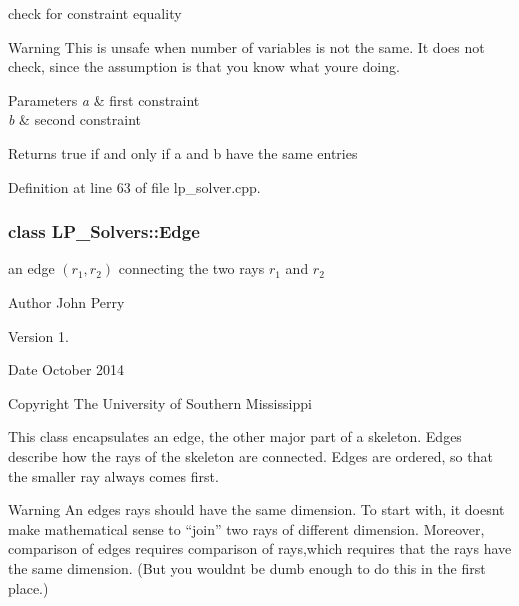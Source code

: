check for constraint equality 

\begin{DoxyWarning}{Warning}
This is unsafe when number of variables is not the same. It does not check, since the assumption is that you know what you\textquotesingle{}re doing. 
\end{DoxyWarning}

\begin{DoxyParams}{Parameters}
{\em a} & first constraint \\
\hline
{\em b} & second constraint \\
\hline
\end{DoxyParams}
\begin{DoxyReturn}{Returns}
{\ttfamily true} if and only if {\ttfamily a} and {\ttfamily b} have the same entries 
\end{DoxyReturn}


Definition at line 63 of file lp\+\_\+solver.\+cpp.

\label{class_l_p___solvers_1_1_edge}
\subsubsection{class L\+P\+\_\+\+Solvers\+:\+:Edge}
an edge $(r_1,r_2)$ connecting the two rays $ r_1 $ and $ r_2 $ 

\begin{DoxyAuthor}{Author}
John Perry 
\end{DoxyAuthor}
\begin{DoxyVersion}{Version}
1. 
\end{DoxyVersion}
\begin{DoxyDate}{Date}
October 2014 
\end{DoxyDate}
\begin{DoxyCopyright}{Copyright}
The University of Southern Mississippi
\end{DoxyCopyright}
This class encapsulates an edge, the other major part of a skeleton. Edges describe how the rays of the skeleton are connected. Edges are ordered, so that the smaller ray always comes first.

\begin{DoxyWarning}{Warning}
An edge\textquotesingle{}s rays should have the same dimension. To start with, it doesn\textquotesingle{}t make mathematical sense to ``join'' two rays of different dimension. Moreover, comparison of edges requires comparison of rays,which requires that the rays have the same dimension. (But you wouldn\textquotesingle{}t be dumb enough to do this in the first place.) 
\end{DoxyWarning}


